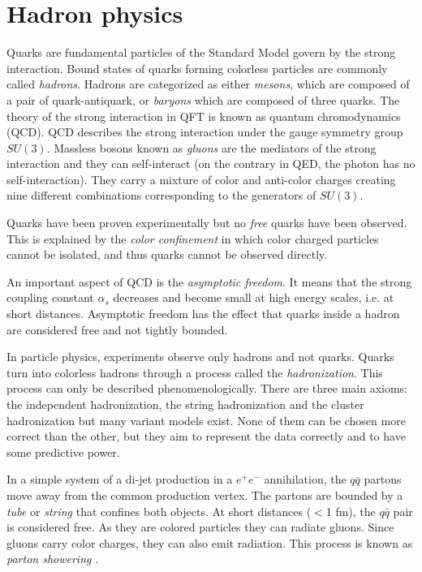 \section{Hadron physics}
\label{sec:Hadrons}

Quarks are fundamental particles of the Standard Model govern by the strong interaction. Bound states of quarks forming colorless particles are commonly called \textit{hadrons}. Hadrons are categorized as either \textit{mesons}, which are composed of a pair of quark-antiquark, or \textit{baryons} which are composed of three quarks. The theory of the strong interaction in QFT is known as quantum chromodynamics (QCD). QCD describes the strong interaction under the gauge symmetry group $SU(3)$. Massless bosons known as \textit{gluons} are the mediators of the strong interaction and they can self-interact (on the contrary in QED, the photon has no self-interaction). They carry a mixture of color and anti-color charges creating nine different combinations corresponding to the generators of $SU(3)$.

Quarks have been proven experimentally but no \textit{free} quarks have been observed. This is explained by the \textit{color confinement} in which color charged particles cannot be isolated, and thus quarks cannot be observed directly.

An important aspect of QCD is the \textit{asymptotic freedom}. It means that the strong coupling constant $\alpha_s$ decreases and become small at high energy scales, i.e. at short distances. Asymptotic freedom has the effect that quarks inside a hadron are considered free and not tightly bounded.

In particle physics, experiments observe only hadrons and not quarks. Quarks turn into colorless hadrons through a process called the \textit{hadronization}. This process can only be described phenomenologically. There are three main axioms: the independent hadronization, the string hadronization \cite{Artru1988} and the cluster hadronization \cite{Webber:1983if} but many variant models exist. None of them can be chosen more correct than the other, but they aim to represent the data correctly and to have some predictive power.

In a simple system of a di-jet production in a $e^+e^-$ annihilation, the $q\bar{q}$ partons move away from the common production vertex. The partons are bounded by a \textit{tube} or \textit{string} that confines both objects. At short distances ($<$1 fm), the $q\bar{q}$ pair is considered free. As they are colored particles they can radiate gluons. Since gluons carry color charges, they can also emit radiation. This process is known as \textit{parton showering} \cite{Feynman:1969wa}.

